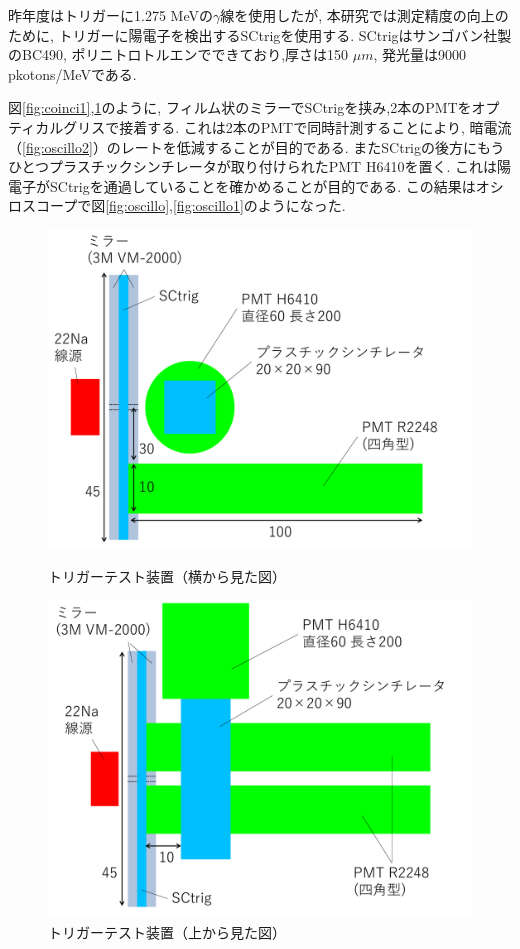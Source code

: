 昨年度はトリガーに1.275 MeVの$\gamma$線を使用したが,
本研究では測定精度の向上のために,
トリガーに陽電子を検出するSCtrigを使用する.
SCtrigはサンゴバン社製のBC490,
ポリニトロトルエンでできており,厚さは150 $\si{\mu m}$,
発光量は9000 pkotons/MeVである.

図\ref{fig:coinci1},\ref{fig:coinci2}のように,
フィルム状のミラーでSCtrigを挟み,2本のPMTをオプティカルグリスで接着する.
これは2本のPMTで同時計測することにより,
暗電流（\ref{fig:oscillo2}）のレートを低減することが目的である.
またSCtrigの後方にもうひとつプラスチックシンチレータが取り付けられたPMT H6410を置く.
これは陽電子がSCtrigを通過していることを確かめることが目的である.
この結果はオシロスコープで図\ref{fig:oscillo},\ref{fig:oscillo1}のようになった.

\begin{figure}[H]
\begin{minipage}{0.5\hsize}
\centering
\includegraphics[keepaspectratio,scale=0.4]{fig/ybm/coinci1.pdf}
\caption{トリガーテスト装置（横から見た図）}
\label{fig:coinci1}
\end{minipage}
\begin{minipage}{0.5\hsize}
\centering
\includegraphics[keepaspectratio,scale=0.4]{fig/ybm/coinci2.pdf}
\caption{トリガーテスト装置（上から見た図）}
\label{fig:coinci2}
\end{minipage}
\end{figure}

